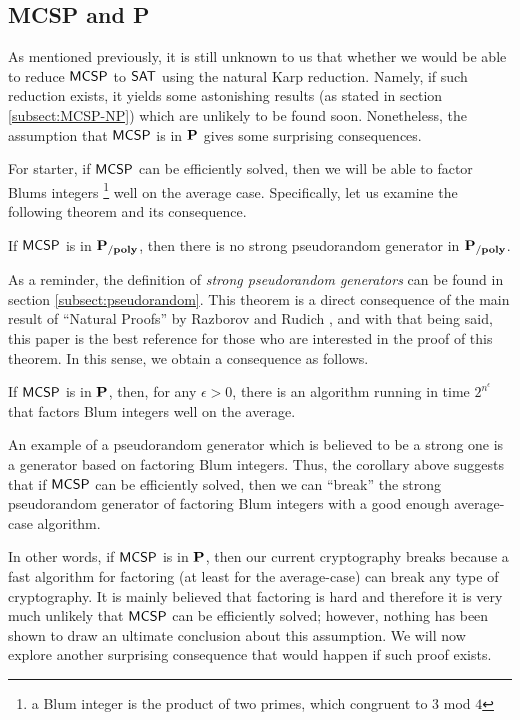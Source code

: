 \documentclass[11pt]{article}
\begin{document}
\subsection{MCSP and P}
\label{subsect:MCSP-P}
As mentioned previously, it is still unknown to us that whether we would be able to reduce $\mathprob{MCSP}$ to $\mathprob{SAT}$ using the natural Karp reduction. Namely, if such reduction exists, it yields some astonishing results (as stated in section \ref{subsect:MCSP-NP}) which are unlikely to be found soon. Nonetheless, the assumption that $\mathprob{MCSP}$ is in $\P$ gives some surprising consequences. 

For starter, if $\mathprob{MCSP}$ can be efficiently solved, then we will be able to factor Blums integers \footnote{a Blum integer is the product of two primes, which congruent to $3$ mod $4$} well on the average case. Specifically, let us examine the following theorem and its consequence.

\begin{theorem}
	If $\mathprob{MCSP}$ is in $\Ppoly$, then there is no strong pseudorandom generator in $\Ppoly$.
\end{theorem}

As a reminder, the definition of \textit{strong pseudorandom generators} can be found in section \ref{subsect:pseudorandom}. This theorem is a direct consequence of the main result of ``Natural Proofs'' by Razborov and Rudich \cite{10.1006/jcss.1997.1494}, and with that being said, this paper is the best reference for those who are interested in the proof of this theorem. In this sense, we obtain a consequence as follows.

\begin{corollary}
	If $\mathprob{MCSP}$ is in $\P$, then, for any $\epsilon > 0$, there is an algorithm running in time $2^{n^{\epsilon}}$ that factors Blum integers well on the average.
\end{corollary}

An example of a pseudorandom generator which is believed to be a strong one is a generator based on factoring Blum integers. Thus, the corollary above suggests that if $\mathprob{MCSP}$ can be efficiently solved, then we can ``break'' the strong pseudorandom generator of factoring Blum integers with a good enough average-case algorithm.  

In other words, if $\mathprob{MCSP}$ is in $\P$, then our current cryptography breaks because a fast algorithm for factoring (at least for the average-case) can break any type of cryptography. It is mainly believed that factoring is hard and therefore it is very much unlikely that $\mathprob{MCSP}$ can be efficiently solved; however, nothing has been shown to draw an ultimate conclusion about this assumption. We will now explore another surprising consequence that would happen if such proof exists.
\end{document}
